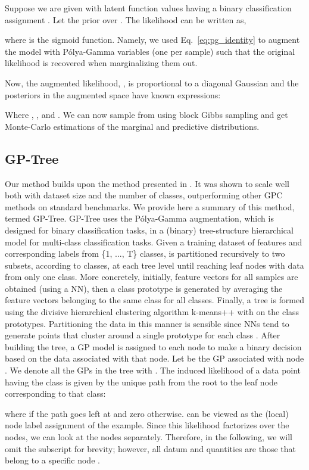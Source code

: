\documentclass{article}
\def\Eqref#1{Eq.~\ref{#1}}
\newcommand{\pg}{P\'olya-Gamma }
\begin{document}
Suppose we are given with latent function values  having a binary classification assignment . Let the prior over . The likelihood can be written as, 

where  is the sigmoid function. Namely, we used \Eqref{eq:pg_identity} to augment the model with \pg variables (one per sample) such that the original likelihood is recovered when marginalizing them out. 

Now, the augmented likelihood, , is proportional to a diagonal Gaussian and the posteriors in the augmented space have known expressions:

Where , , and . We can now sample from  using block Gibbs sampling and get Monte-Carlo estimations of the marginal and predictive distributions.


\subsection{GP-Tree} \label{sec_app:gp_tree}
Our method builds upon the method presented in \cite{achituve2021gp_icml}. It was shown to scale well both with dataset size and the number of classes, outperforming other GPC methods on standard benchmarks. We provide here a summary of this method, termed GP-Tree. GP-Tree uses the \pg augmentation, which is designed for binary classification tasks, in a (binary) tree-structure hierarchical model for multi-class classification tasks. Given a training dataset  of features and corresponding labels from \{1, ..., T\} classes,  is partitioned recursively to two subsets, according to classes, at each tree level until reaching leaf nodes with data from only one class. More concretely, initially, feature vectors for all samples are obtained (using a NN), then a class prototype is generated by averaging the feature vectors belonging to the same class for all classes. Finally, a tree is formed using the divisive hierarchical clustering algorithm k-means++ \cite{arthur2007k} with  on the class prototypes. Partitioning the data in this manner is sensible since NNs tend to generate points that cluster around a single prototype for each class \cite{snell2017prototypical}. After building the tree, a GP model is assigned to each node to make a binary decision based on the data associated with that node. Let  be the GP associated with node . We denote all the GPs in the tree with . The induced likelihood of a data point having the class  is given by the unique path  from the root to the leaf node corresponding to that class:

where  if the path goes left at  and zero otherwise.  can be viewed as the (local) node label assignment of the example. Since this likelihood factorizes over the nodes, we can look at the nodes separately. Therefore, in the following, we will omit the subscript  for brevity; however, all datum and quantities are those that belong to a specific node .
\end{document}
